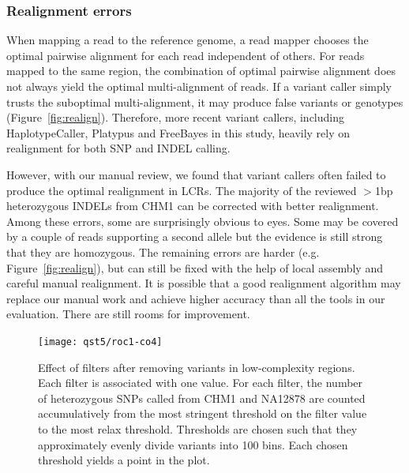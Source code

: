 \documentclass{bioinfo}
\begin{document}
\subsubsection{Realignment errors}
When mapping a read to the reference genome, a read mapper chooses the optimal
pairwise alignment for each read independent of others. For reads mapped to the
same region, the combination of optimal pairwise alignment does not always
yield the optimal multi-alignment of reads. If a variant caller simply trusts
the suboptimal multi-alignment, it may produce false variants or genotypes
(Figure~\ref{fig:realign}). Therefore, more recent variant callers, including
HaplotypeCaller, Platypus and FreeBayes in this study, heavily rely on
realignment for both SNP and INDEL calling.

However, with our manual review, we found that variant callers often failed to
produce the optimal realignment in LCRs. The majority of the reviewed
$>$1bp heterozygous INDELs from CHM1 can be corrected with better realignment.
Among these errors, some are surprisingly obvious to eyes. Some may be covered
by a couple of reads supporting a second allele but the evidence is still
strong that they are homozygous. The remaining errors are harder (e.g.
Figure~\ref{fig:realign}), but can still be fixed with the help of local
assembly and careful manual realignment. It is possible that a good realignment
algorithm may replace our manual work and achieve higher accuracy than all the
tools in our evaluation. There are still rooms for improvement.


\begin{figure}
\texttt{[image: qst5/roc1-co4]}
\caption{Effect of filters after removing variants in low-complexity regions.
Each filter is associated with one value.  For each filter, the number of
heterozygous SNPs called from CHM1 and NA12878 are counted accumulatively from
the most stringent threshold on the filter value to the most relax threshold.
Thresholds are chosen such that they approximately evenly divide variants into
100 bins. Each chosen threshold yields a point in the plot.}\label{fig:roc}
\end{figure}
\end{document}
